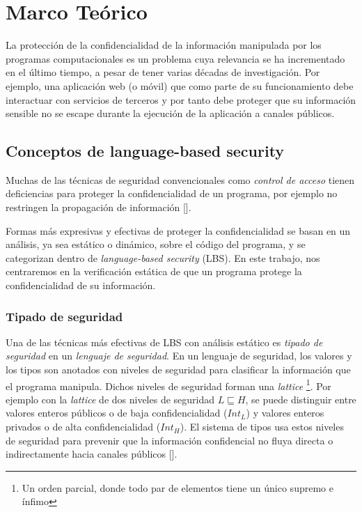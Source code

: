 \chapter{Marco Teórico}

	La protección de la confidencialidad de la información manipulada por los programas computacionales es un problema cuya relevancia se ha incrementado en el último tiempo, a pesar de tener varias décadas de investigación. Por ejemplo, una aplicación web (o móvil) que como parte de su funcionamiento debe interactuar con servicios de terceros y por tanto debe proteger que su información sensible no se escape durante la ejecución de la aplicación a canales públicos.

\section{Conceptos de language-based security}

	Muchas de las técnicas de seguridad convencionales como \textit{control de acceso} tienen deficiencias para proteger la confidencialidad de un programa, por ejemplo no restringen la propagación de información []. %

	Formas más expresivas y efectivas de proteger la confidencialidad se basan en un análisis, ya sea estático o dinámico, sobre el código del programa, y se categorizan dentro de \textit{language-based security} (LBS). En este trabajo, nos centraremos en la verificación estática de que un programa protege la confidencialidad de su información.

	\subsection{Tipado de seguridad}
	Una de las técnicas más efectivas de LBS con análisis estático es \textit{tipado de seguridad} en un \textit{lenguaje de seguridad}. En un lenguaje de seguridad, los valores y los tipos son anotados con niveles de seguridad para clasificar la información que el programa manipula. Dichos niveles de seguridad forman una \textit{lattice} \footnote{Un orden parcial, donde todo par de elementos tiene un único supremo e ínfimo}. Por ejemplo con la \textit{lattice} de dos niveles de seguridad $L \sqsubseteq H$, se puede distinguir entre valores enteros públicos o de baja confidencialidad ($Int_L$) y valores enteros privados o de alta confidencialidad ($Int_H$). El sistema de tipos usa estos niveles de seguridad para prevenir que la información confidencial no fluya directa o indirectamente hacia canales públicos []. %


